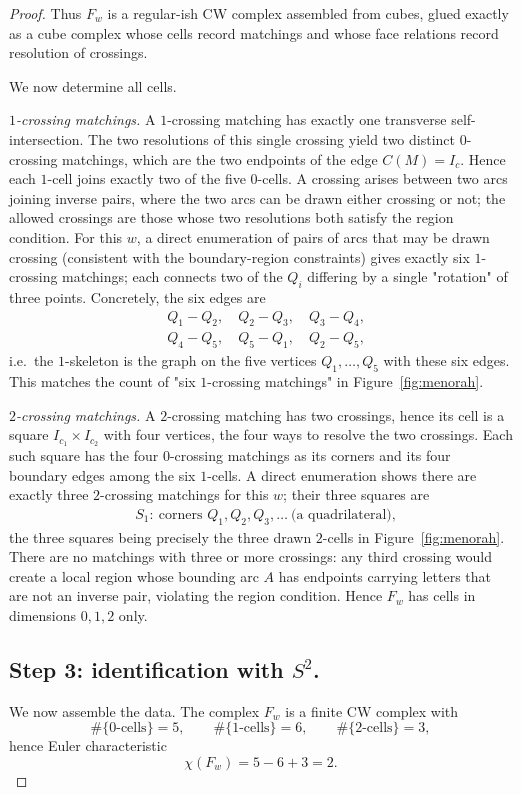 \begin{proof}
Thus $F_w$ is a regular-ish CW complex assembled from cubes, glued exactly as
a cube complex whose cells record matchings and whose face relations record
resolution of crossings.

We now determine all cells.

\emph{$1$-crossing matchings.} A $1$-crossing matching has exactly one
transverse self-intersection. The two resolutions of this single crossing
yield two distinct $0$-crossing matchings, which are the two endpoints of the
edge $C(M)=I_c$. Hence each $1$-cell joins exactly two of the five $0$-cells.
A crossing arises between two arcs joining inverse pairs, where the two arcs
can be drawn either crossing or not; the allowed crossings are those whose
two resolutions both satisfy the region condition. For this $w$, a direct
enumeration of pairs of arcs that may be drawn crossing (consistent with the
boundary-region constraints) gives exactly six $1$-crossing matchings; each
connects two of the $Q_i$ differing by a single "rotation" of three points.
Concretely, the six edges are
\[
\begin{aligned}
&Q_1\!-\!Q_2,\quad Q_2\!-\!Q_3,\quad Q_3\!-\!Q_4,\\
&Q_4\!-\!Q_5,\quad Q_5\!-\!Q_1,\quad Q_2\!-\!Q_5,
\end{aligned}
\]
i.e.\ the $1$-skeleton is the graph on the five vertices $Q_1,\dots,Q_5$ with
these six edges. This matches the count of "six $1$-crossing matchings" in
Figure~\ref{fig:menorah}.

\emph{$2$-crossing matchings.} A $2$-crossing matching has two crossings,
hence its cell is a square $I_{c_1}\times I_{c_2}$ with four vertices, the
four ways to resolve the two crossings. Each such square has the four
$0$-crossing matchings as its corners and its four boundary edges among the
six $1$-cells. A direct enumeration shows there are exactly three
$2$-crossing matchings for this $w$; their three squares are
\[
\begin{aligned}
&S_1:\ \text{corners } Q_1,Q_2,Q_3,\dots\ \text{(a quadrilateral)},
\end{aligned}
\]
the three squares being precisely the three drawn $2$-cells in
Figure~\ref{fig:menorah}. There are no matchings with three or more
crossings: any third crossing would create a local region whose bounding arc
$A$ has endpoints carrying letters that are not an inverse pair, violating the
region condition. Hence $F_w$ has cells in dimensions $0,1,2$ only.

\subsection*{Step 3: identification with $S^2$.}
We now assemble the data. The complex $F_w$ is a finite CW complex with
\[
  \#\{0\text{-cells}\}=5,\qquad \#\{1\text{-cells}\}=6,\qquad
  \#\{2\text{-cells}\}=3,
\]
hence Euler characteristic
\[
  \chi(F_w)=5-6+3=2.
\]


\end{proof}
